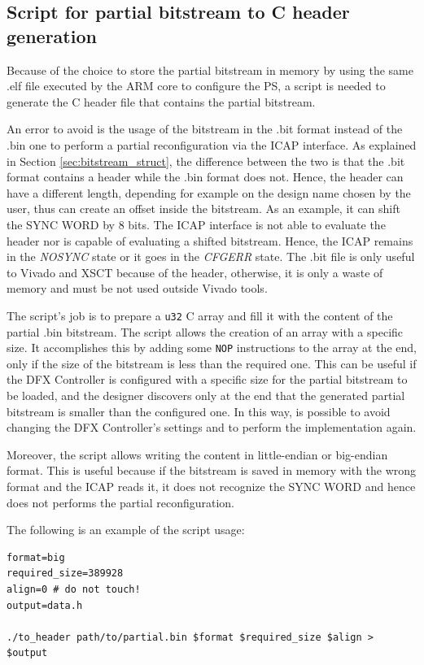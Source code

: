 \subsection{Script for partial bitstream to C header generation}
\label{sec:script_header}

Because of the choice to store the partial bitstream in memory by using the same .elf file executed by the ARM core to configure the PS, a script is needed to generate the C header file that contains the partial bitstream. \bigskip

An error to avoid is the usage of the bitstream in the .bit format instead of the .bin one to perform a partial reconfiguration via the ICAP interface. As explained in Section \ref{sec:bitstream_struct}, the difference between the two is that the .bit format contains a header while the .bin format does not. Hence, the header can have a different length, depending for example on the design name chosen by the user, thus can create an offset inside the bitstream. As an example, it can shift the SYNC WORD by 8 bits. The ICAP interface is not able to evaluate the header nor is capable of evaluating a shifted bitstream. Hence, the ICAP remains in the \textit{NOSYNC} state or it goes in the \textit{CFGERR} state. The .bit file is only useful to Vivado and XSCT because of the header, otherwise, it is only a waste of memory and must be not used outside Vivado tools.\bigskip

The script's job is to prepare a \texttt{u32} C array and fill it with the content of the partial .bin bitstream. The script allows the creation of an array with a specific size. It accomplishes this by adding some \texttt{NOP} instructions to the array at the end, only if the size of the bitstream is less than the required one. This can be useful if the DFX Controller is configured with a specific size for the partial bitstream to be loaded, and the designer discovers only at the end that the generated partial bitstream is smaller than the configured one. In this way, is possible to avoid changing the DFX Controller's settings and to perform the implementation again. \bigskip

Moreover, the script allows writing the content in little-endian or big-endian format. This is useful because if the bitstream is saved in memory with the wrong format and the ICAP reads it, it does not recognize the SYNC WORD and hence does not performs the partial reconfiguration.\bigskip

The following is an example of the script usage:
\begin{lstlisting}[style=preformatted]
format=big
required_size=389928
align=0 # do not touch!
output=data.h

./to_header path/to/partial.bin $format $required_size $align > $output
\end{lstlisting}

\nocite{9721707}
\nocite{9457491}
\nocite{9425022}
\nocite{DESIO2019113342}
\nocite{8093152}
\nocite{9325281}
\nocite{AZIMI201795}
\nocite{DESIO2020113733}
